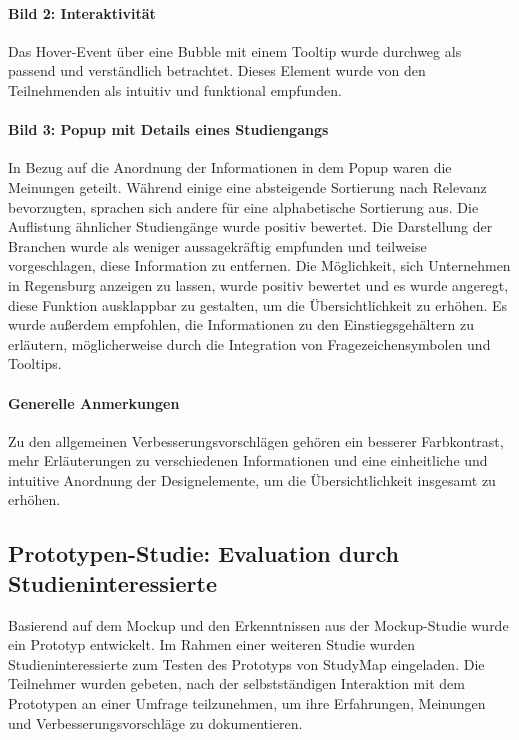 \paragraph{Bild 2: Interaktivität}
Das Hover-Event über eine Bubble mit einem Tooltip wurde durchweg als passend und verständlich betrachtet. Dieses Element wurde von den Teilnehmenden als intuitiv und funktional empfunden.

\paragraph{Bild 3: Popup mit Details eines Studiengangs}
In Bezug auf die Anordnung der Informationen in dem Popup waren die Meinungen geteilt. Während einige eine absteigende Sortierung nach Relevanz bevorzugten, sprachen sich andere für eine alphabetische Sortierung aus. Die Auflistung ähnlicher Studiengänge wurde positiv bewertet. Die Darstellung der Branchen wurde als weniger aussagekräftig empfunden und teilweise vorgeschlagen, diese Information zu entfernen. Die Möglichkeit, sich Unternehmen in Regensburg anzeigen zu lassen, wurde positiv bewertet und es wurde angeregt, diese Funktion ausklappbar zu gestalten, um die Übersichtlichkeit zu erhöhen. Es wurde außerdem empfohlen, die Informationen zu den Einstiegsgehältern zu erläutern, möglicherweise durch die Integration von Fragezeichensymbolen und Tooltips.

\paragraph{Generelle Anmerkungen}
Zu den allgemeinen Verbesserungsvorschlägen gehören ein besserer Farbkontrast, mehr Erläuterungen zu verschiedenen Informationen und eine einheitliche und intuitive Anordnung der Designelemente, um die Übersichtlichkeit insgesamt zu erhöhen.

%
%
%
%
%
%
\subsection{Prototypen-Studie: Evaluation durch Studieninteressierte}
Basierend auf dem Mockup und den Erkenntnissen aus der Mockup-Studie wurde ein Prototyp entwickelt. Im Rahmen einer weiteren Studie wurden Studieninteressierte zum Testen des Prototyps von StudyMap eingeladen. Die Teilnehmer wurden gebeten, nach der selbstständigen Interaktion mit dem Prototypen an einer Umfrage teilzunehmen, um ihre Erfahrungen, Meinungen und Verbesserungsvorschläge zu dokumentieren.

